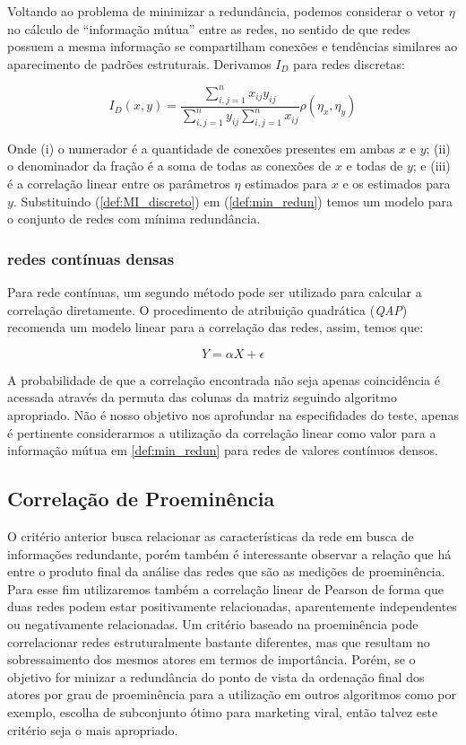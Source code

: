 \documentclass{article}
\begin{document}
Voltando ao problema de minimizar a redundância, podemos considerar o vetor
$\eta$ no cálculo de ``informação mútua'' entre as redes, no sentido de que
redes possuem a mesma informação se compartilham conexões e tendências similares
ao aparecimento de padrões estruturais. Derivamos $I_D$ para redes discretas:

\begin{equation}
\label{def:MI_discreto}
I_D(x, y) =\frac{\sum_{i,j = 1}^n x_{ij}y_{ij}}{\sum_{i,j = 1}^n
y_{ij}\sum_{i,j=1}^n x_{ij}} \rho(\eta_x, \eta_y)
\end{equation}

Onde (i) o numerador é a quantidade de conexões presentes em ambas $x$ e $y$;
(ii) o denominador da fração é a soma de todas as conexões de $x$ e todas de
$y$; e (iii) é a correlação linear entre os parâmetros $\eta$ estimados para $x$
e os estimados para $y$. Substituindo (\ref{def:MI_discreto}) em
(\ref{def:min_redun}) temos um modelo para o conjunto de redes com mínima
redundância.

\subsubsection{redes contínuas densas}

Para rede contínuas, um segundo método pode ser utilizado para calcular a
correlação diretamente. O procedimento de atribuição quadrática (\textit{QAP})
recomenda um modelo linear para a correlação das redes, assim, temos que:

\begin{equation}
\label{def:linear_model_qap}
Y = \alpha X + \epsilon
\end{equation}

A probabilidade de que a correlação encontrada não seja apenas coincidência é
acessada através da permuta das colunas da matriz seguindo algoritmo apropriado.
Não é nosso objetivo nos aprofundar na especifidades do teste, apenas é pertinente
considerarmos a  utilização da correlação linear como valor para a informação
mútua em \ref{def:min_redun} para redes de valores contínuos densos.

\subsection{Correlação de Proeminência}

O critério anterior busca relacionar as características da rede em busca de
informações redundante, porém também é interessante observar a relação que há
entre o produto final da análise das redes que são as medições de proeminência.
Para esse fim utilizaremos também a correlação linear de Pearson de forma que
duas redes podem estar positivamente relacionadas, aparentemente independentes
ou negativamente relacionadas. Um critério baseado na proeminência pode
correlacionar redes estruturalmente bastante diferentes, mas que resultam no
sobressaimento dos mesmos atores em termos de importância. Porém, se o objetivo
for minizar a redundância do ponto de vista da ordenação final dos atores por
grau de proeminência para a utilização em outros algoritmos como por exemplo,
escolha de subconjunto ótimo para marketing viral, então talvez este critério
seja o mais apropriado.
\end{document}
